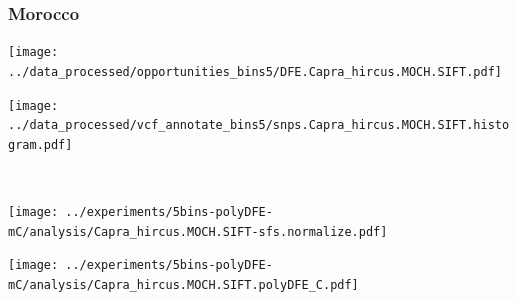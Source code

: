 \subsubsection{Morocco}

\begin{minipage}{0.49\linewidth}
    \texttt{[image: ../data\_processed/opportunities\_bins5/DFE.Capra\_hircus.MOCH.SIFT.pdf]}
\end{minipage}
\begin{minipage}{0.49\linewidth}
    \texttt{[image: ../data\_processed/vcf\_annotate\_bins5/snps.Capra\_hircus.MOCH.SIFT.histogram.pdf]}
\end{minipage}
\\
\begin{minipage}{0.49\linewidth}
    \texttt{[image: ../experiments/5bins-polyDFE-mC/analysis/Capra\_hircus.MOCH.SIFT-sfs.normalize.pdf]}
\end{minipage}
\begin{minipage}{0.4\linewidth}
    \texttt{[image: ../experiments/5bins-polyDFE-mC/analysis/Capra\_hircus.MOCH.SIFT.polyDFE\_C.pdf]}
\end{minipage}
